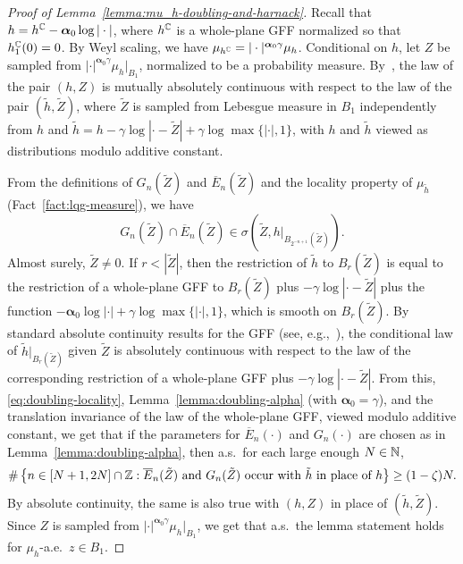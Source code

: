 \documentclass[12pt]{amsart}
\numberwithin{equation}{section}
\begin{document}
	\begin{proof}[Proof of Lemma~\ref{lemma:mu_h-doubling-and-harnack}]
		Recall that $h = h^{\mathbb{C}} - \boldsymbol{\alpha}_0 \log|\cdot|$, where $h^{\mathbb{C}}$ is a whole-plane GFF normalized so that $h^{\mathbb{C}}_1(0) = 0$. 
		By Weyl scaling, we have $\mu_{h^{\mathbb{C}}} = |\cdot|^{\boldsymbol{\alpha}_0 \gamma} \mu_h$. 
		Conditional on $h$, let $Z$ be sampled from $|\cdot|^{\boldsymbol{\alpha}_0 \gamma} \mu_{h}|_{B_1}$, normalized to be a probability measure. 
		By~\cite[Lemma A.10]{duplantier2014liouville}, the law of the pair $(h, Z)$ is mutually absolutely continuous with respect to the law of the pair $(\tilde h , \tilde Z)$, where $\tilde Z$ is sampled from Lebesgue measure in $B_1$ independently from $h$ and $\tilde h = h  - \gamma\log|\cdot-\tilde Z|  + \gamma \log \max\{|\cdot|,1\}$, with $h$ and $\tilde h$ viewed as distributions modulo additive constant. 
		
		From the definitions of $G_n(\tilde Z)$ and $\overline E_n(\tilde Z)$ and the locality property of $\mu_{\tilde h}$ (Fact~\ref{fact:lqg-measure}), we have 
		\begin{equation} \label{eq:doubling-locality}
		G_n(\tilde Z) \cap \overline E_n(\tilde Z) \in \sigma\left( \tilde Z  , h |_{B_{2^{-n+1}}(\tilde Z)} \right).
		\end{equation}
		Almost surely, $\tilde Z \not= 0$. If $r < |\tilde Z|$, then the restriction of $\tilde h$ to $B_r(\tilde Z)$ is equal to the restriction of a whole-plane GFF to $B_r(\tilde Z)$ plus $- \gamma\log|\cdot-\tilde Z|$ plus the function $-\boldsymbol{\alpha}_0 \log|\cdot|  + \gamma \log\max\{|\cdot|,1\}$, which is smooth on $B_r(\tilde Z)$. By standard absolute continuity results for the GFF (see, e.g.,~\cite[Proposition 2.9]{miller2017imaginary}), the conditional law of $\tilde h|_{B_r(\tilde Z)}$ given $\tilde Z$ is absolutely continuous with respect  to the law of the corresponding restriction of a whole-plane GFF plus $-\gamma\log|\cdot-\tilde Z|$.  
		From this, \eqref{eq:doubling-locality}, Lemma~\ref{lemma:doubling-alpha} (with $\boldsymbol{\alpha}_0 =\gamma$), and the translation invariance of the law of the whole-plane GFF, viewed modulo additive constant, we get that if the parameters for $\overline E_n(\cdot)$ and  $G_{n}(\cdot)$ are chosen as in Lemma~\ref{lemma:doubling-alpha}, then a.s.\ for each large enough $N\in\mathbb{N}$, 
		\begin{equation} \label{eq:mu_h-doubling-reweight}
		\#\left\{ n \in [N+1,2N] \cap \mathbb{Z}  : \mbox{$\overline E_{n}(\tilde Z)$ and $G_{n}(\tilde Z)$ occur with $\tilde h$ in place of $h$} \right\}  \geq (1-\zeta) N.
		\end{equation}  
		By absolute continuity, the same is also true with $(h,Z)$ in place of $(\tilde h , \tilde Z)$. Since $Z$ is sampled from $|\cdot|^{\boldsymbol{\alpha}_0 \gamma} \mu_{h}|_{B_1}$, we get that a.s.\ the lemma statement holds for $\mu_h$-a.e.\ $z\in B_1$. 
	\end{proof}
	
\end{document}
